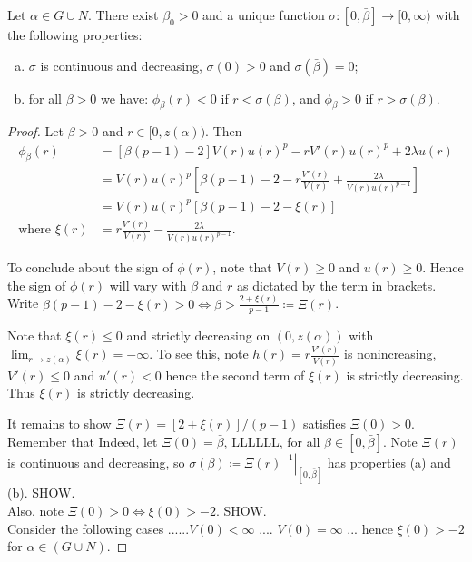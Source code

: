 \newpage
\begin{lemma}Let $\alpha\in G\cup N$. There exist $\beta_0>0$ and a unique function $\sigma:[0,\bar\beta]\to[0,\infty)$ with the following properties: \begin{enumerate}[(a)]
	\item  $\sigma$ is continuous and decreasing, $\sigma(0)>0$ and $\sigma(\bar\beta)=0$;
    \item for all $\beta>0$ we have: $\phi_\beta(r)<0$ if $r<\sigma(\beta)$, and $\phi_\beta>0$ if $r>\sigma(\beta)$.
\end{enumerate}
\begin{proof} 
Let $\beta>0$ and $r\in[0,z(\alpha))$. Then \begin{align*}
\phi_{\beta}(r)&=\left[\beta(p-1)-2\right]V(r)u(r)^p-rV'(r)u(r)^p+2\lambda u(r) %
\\ &=V(r)u(r)^p\left[\beta(p-1)-2-r\frac{V'(r)}{V(r)}+\frac{2\lambda}{V(r)u(r)^{p-1}}\right] 
\\ &= V(r)u(r)^p\left[\beta(p-1)-2-\xi(r)\right]
\\\text{where }\xi(r)&=r\frac{V'(r)}{V(r)}-\frac{2\lambda}{V(r)u(r)^{p-1}}.
\end{align*}

To conclude about the sign of $\phi(r)$, note that $V(r)\geq0$ and $u(r)\geq0$. Hence the sign of $\phi(r)$ will vary with $\beta$ and $r$ as dictated by the term in brackets. Write $\beta(p-1)-2-\xi(r)>0\iff\beta>\frac{2+\xi(r)}{p-1}\coloneqq\Xi(r)$.

Note that $\xi(r)\leq0$ and strictly decreasing on $(0,z(\alpha))$ with $\lim_{r\to z(\alpha)}\xi(r)=-\infty$. To see this, note $h(r)=r\frac{V'(r)}{V(r)}$ is nonincreasing, $V'(r)\leq0$ and $u'(r)<0$ hence the second term of $\xi(r)$ is strictly decreasing. Thus $\xi(r)$ is strictly decreasing.

It remains to show $\Xi(r)=\left[2+\xi(r)\right]/(p-1)$ satisfies $\Xi(0)>0$. Remember that  Indeed, let $\Xi(0)=\bar\beta$, LLLLLL, for all $\beta\in[0,\bar\beta]$. Note $\Xi(r)$ is continuous and decreasing, so $\sigma(\beta)\coloneqq\left.\Xi(r)^{-1}\right|_{[0,\bar\beta]}$ has properties (a) and (b). SHOW. \\

Also, note $\Xi(0)>0\iff\xi(0)>-2$. SHOW.\\

Consider the following cases ......$V(0)<\infty$ .... $V(0)=\infty$ ... hence $\xi(0)>-2$ for $\alpha\in(G\cup N)$.

\end{proof}
\end{lemma}